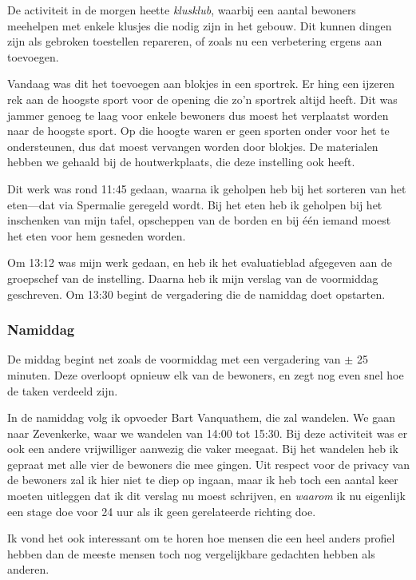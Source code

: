 \documentclass[a4paper,12pt]{article}
\begin{document}
De activiteit in de morgen heette \emph{klusklub}, waarbij een aantal bewoners meehelpen met enkele klusjes die nodig zijn in het gebouw. Dit kunnen dingen zijn als gebroken toestellen repareren, of zoals nu een verbetering ergens aan toevoegen.

Vandaag was dit het toevoegen aan blokjes in een sportrek. Er hing een ijzeren rek aan de hoogste sport voor de opening die zo'n sportrek altijd heeft. Dit was jammer genoeg te laag voor enkele bewoners dus moest het verplaatst worden naar de hoogste sport. Op die hoogte waren er geen sporten onder voor het te ondersteunen, dus dat moest vervangen worden door blokjes. De materialen hebben we gehaald bij de houtwerkplaats, die deze instelling ook heeft.

Dit werk was rond 11:45 gedaan, waarna ik geholpen heb bij het sorteren van het eten---dat via Spermalie geregeld wordt. Bij het eten heb ik geholpen bij het inschenken van mijn tafel, opscheppen van de borden en bij één iemand moest het eten voor hem gesneden worden.

Om 13:12 was mijn werk gedaan, en heb ik het evaluatieblad afgegeven aan de groepschef van de instelling. Daarna heb ik mijn verslag van de voormiddag geschreven. Om 13:30 begint de vergadering die de namiddag doet opstarten.

\subsubsection{Namiddag}

De middag begint net zoals de voormiddag met een vergadering van $\pm$ 25 minuten. Deze overloopt opnieuw elk van de bewoners, en zegt nog even snel hoe de taken verdeeld zijn.

In de namiddag volg ik opvoeder Bart Vanquathem, die zal wandelen. We gaan naar Zevenkerke, waar we wandelen van 14:00 tot 15:30. Bij deze activiteit was er ook een andere vrijwilliger aanwezig die vaker meegaat. Bij het wandelen heb ik gepraat met alle vier de bewoners die mee gingen. Uit respect voor de privacy van de bewoners zal ik hier niet te diep op ingaan, maar ik heb toch een aantal keer moeten uitleggen dat ik dit verslag nu moest schrijven, en \emph{waarom} ik nu eigenlijk een stage doe voor 24 uur als ik geen gerelateerde richting doe.

Ik vond het ook interessant om te horen hoe mensen die een heel anders profiel hebben dan de meeste mensen toch nog vergelijkbare gedachten hebben als anderen.
\end{document}
